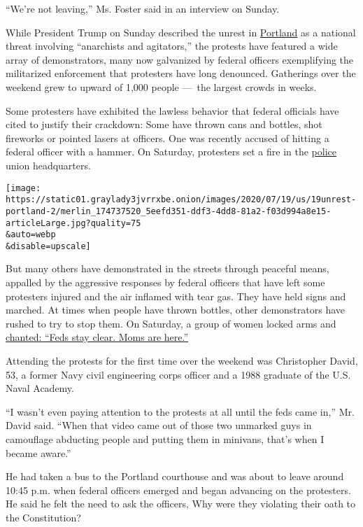 ``We're not leaving,'' Ms. Foster said in an interview on Sunday.

While President Trump on Sunday described the unrest in
\href{https://www.nytimes3xbfgragh.onion/2020/07/20/us/portland-protests-navy-christopher-david.html}{Portland}
as a national threat involving ``anarchists and agitators,'' the
protests have featured a wide array of demonstrators, many now
galvanized by federal officers exemplifying the militarized enforcement
that protesters have long denounced. Gatherings over the weekend grew to
upward of 1,000 people ---~the largest crowds in weeks.

Some protesters have exhibited the lawless behavior that federal
officials have cited to justify their crackdown: Some have thrown cans
and bottles, shot fireworks or pointed lasers at officers. One was
recently accused of hitting a federal officer with a hammer. On
Saturday, protesters set a fire in the
\href{https://www.nytimes3xbfgragh.onion/2020/07/21/us/detroit-police-shooting-journalists.html}{police}
union headquarters.

\texttt{[image: https://static01.graylady3jvrrxbe.onion/images/2020/07/19/us/19unrest-portland-2/merlin\_174737520\_5eefd351-ddf3-4dd8-81a2-f03d994a8e15-articleLarge.jpg?quality=75\\\&auto=webp\\\&disable=upscale]}

But many others have demonstrated in the streets through peaceful means,
appalled by the aggressive responses by federal officers that have left
some protesters injured and the air inflamed with tear gas. They have
held signs and marched. At times when people have thrown bottles, other
demonstrators have rushed to try to stop them. On Saturday, a group of
women locked arms and
\href{https://twitter.com/JoshuaPotash/status/1284704272282800128}{chanted:
``Feds stay clear. Moms are here.''}

Attending the protests for the first time over the weekend was
Christopher David, 53, a former Navy civil engineering corps officer and
a 1988 graduate of the U.S. Naval Academy.

``I wasn't even paying attention to the protests at all until the feds
came in,'' Mr. David said. ``When that video came out of those two
unmarked guys in camouflage abducting people and putting them in
minivans, that's when I became aware.''

He had taken a bus to the Portland courthouse and was about to leave
around 10:45 p.m. when federal officers emerged and began advancing on
the protesters. He said he felt the need to ask the officers, Why were
they violating their oath to the Constitution?

